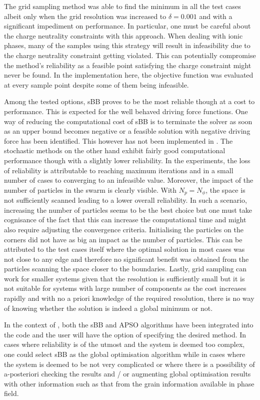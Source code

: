 The grid sampling method was able to find the minimum in all the test cases albeit only when the grid resolution was increased to $\delta = 0.001$ and with a significant impediment on performance. In particular, one must be careful about the charge neutrality constraints with this approach. When dealing with ionic phases, many of the samples using this strategy will result in infeasibility due to the charge neutrality constraint getting violated. This can potentially compromise the method's reliability as a feasible point satisfying the charge constraint might never be found. In the implementation here, the objective function was evaluated at every sample point despite some of them being infeasible.

Among the tested options, sBB proves to be the most reliable though at a cost to performance. This is expected for the well behaved driving force functions. One way of reducing the computational cost of sBB is to terminate the solver as soon as an upper bound becomes negative or a feasible solution with negative driving force has been identified. This however has not been implemented in {\GEM}. The stochastic methods on the other hand exhibit fairly good computational performance though with a slightly lower reliability. In the experiments, the loss of reliability is attributable to reaching maximum iterations and in a small number of cases to converging to an infeasible value. Moreover, the impact of the number of particles in the swarm is clearly visible. With $N_p = N_\phi$, the space is not sufficiently scanned leading to a lower overall reliability. In such a scenario, increasing the number of particles seems to be the best choice but one must take cognisance of the fact that this can increase the computational time and might also require adjusting the convergence criteria. Initialising the particles on the corners did not have as big an impact as the number of particles. This can be attributed to the test cases itself where the optimal solution in most cases was not close to any edge and therefore no significant benefit was obtained from the particles scanning the space closer to the boundaries. Lastly, grid sampling can work for smaller systems given that the resolution is sufficiently small but it is not suitable for systems with large number of components as the cost increases rapidly and with no a priori knowledge of the required resolution, there is no way of knowing whether the solution is indeed a global minimum or not.

In the context of {\YJ}, both the sBB and APSO algorithms have been integrated into the code and the user will have the option of specifying the desired method. In cases where reliability is of the utmost and the system is deemed too complex, one could select sBB as the global optimisation algorithm while in cases where the system is deemed to be not very complicated or where there is a possibility of a-posteriori checking the results and / or augmenting global optimisation results with other information such as that from the grain information available in phase field.

